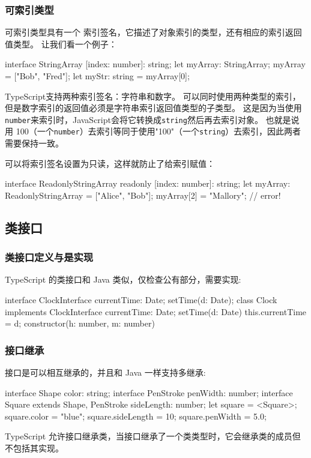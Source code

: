 \subsubsection*{可索引类型}

可索引类型具有一个 索引签名，它描述了对象索引的类型，还有相应的索引返回值类型。 让我们看一个例子：

\begin{TypeScript}
interface StringArray {
  [index: number]: string;
}
let myArray: StringArray;
myArray = ["Bob", "Fred"];
let myStr: string = myArray[0];
\end{TypeScript}

TypeScript支持两种索引签名：字符串和数字。 可以同时使用两种类型的索引，但是数字索引的返回值必须是字符串索引返回值类型的子类型。 这是因为当使用 \texttt{number}来索引时，JavaScript会将它转换成\texttt{string}然后再去索引对象。 也就是说用 100（一个\texttt{number}）去索引等同于使用"100"（一个\texttt{string}）去索引，因此两者需要保持一致。

可以将索引签名设置为只读，这样就防止了给索引赋值：

\begin{TypeScript}
interface ReadonlyStringArray {
    readonly [index: number]: string;
}
let myArray: ReadonlyStringArray = ["Alice", "Bob"];
myArray[2] = "Mallory"; // error!
\end{TypeScript}

\subsection{类接口}

\subsubsection*{类接口定义与是实现}

TypeScript 的类接口和 Java 类似，仅检查公有部分，需要实现:

\begin{TypeScript}
interface ClockInterface {
    currentTime: Date;
    setTime(d: Date);
}
class Clock implements ClockInterface {
    currentTime: Date;
    setTime(d: Date) {
        this.currentTime = d;
    }
    constructor(h: number, m: number) { }
}
\end{TypeScript}

\subsubsection*{接口继承}

接口是可以相互继承的，并且和 Java 一样支持多继承:

\begin{TypeScript}
interface Shape {
    color: string;
}
interface PenStroke {
    penWidth: number;
}
interface Square extends Shape, PenStroke {
    sideLength: number;
}
let square = <Square>{};
square.color = "blue";
square.sideLength = 10;
square.penWidth = 5.0;
\end{TypeScript}

TypeScript 允许接口继承类，当接口继承了一个类类型时，它会继承类的成员但不包括其实现。 

\newpage